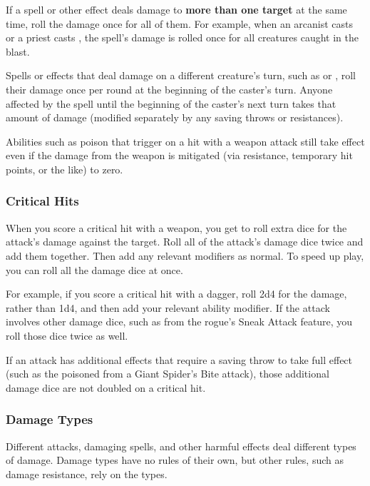 If a spell or other effect deals damage to \textbf{more than one target} at the same time, roll the damage once for all of them. For example, when an arcanist casts  or a priest casts , the spell's damage is rolled once for all creatures caught in the blast.

Spells or effects that deal damage on a different creature's turn, such as  or , roll their damage once per round at the beginning of the caster's turn. Anyone affected by the spell until the beginning of the caster's next turn takes that amount of damage (modified separately by any saving throws or resistances).

Abilities such as poison that trigger on a hit with a weapon attack still take effect even if the damage from the weapon is mitigated (via resistance, temporary hit points, or the like) to zero.

\subsubsection{Critical Hits} \label{sec:critical-hits}

When you score a critical hit with a weapon, you get to roll extra dice for the attack's damage against the target. Roll all of the attack's damage dice twice and add them together. Then add any relevant modifiers as normal. To speed up play, you can roll all the damage dice at once.

For example, if you score a critical hit with a dagger, roll 2d4 for the damage, rather than 1d4, and then add your relevant ability modifier. If the attack involves other damage dice, such as from the rogue's Sneak Attack feature, you roll those dice twice as well.

If an attack has additional effects that require a saving throw to take full effect (such as the poisoned from a Giant Spider's Bite attack), those additional damage dice are not doubled on a critical hit.

\subsubsection{Damage Types}

Different attacks, damaging spells, and other harmful effects deal different types of damage. Damage types have no rules of their own, but other rules, such as damage resistance, rely on the types.

